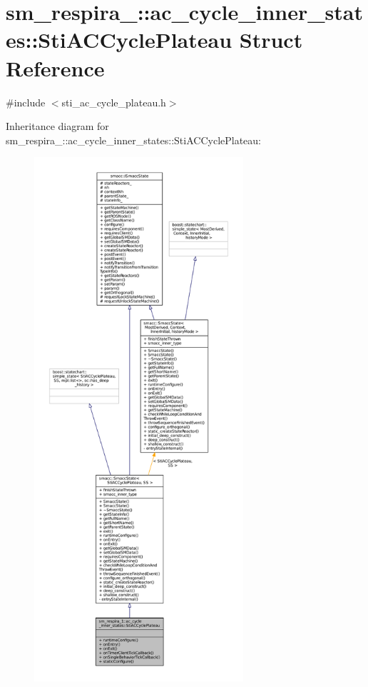 \hypertarget{structsm__respira__1_1_1ac__cycle__inner__states_1_1StiACCyclePlateau}{}\section{sm\+\_\+respira\+\_\+:\+:ac\+\_\+cycle\+\_\+inner\+\_\+states\+:\+:Sti\+A\+C\+Cycle\+Plateau Struct Reference}
\label{structsm__respira__1_1_1ac__cycle__inner__states_1_1StiACCyclePlateau}


{\ttfamily \#include $<$sti\+\_\+ac\+\_\+cycle\+\_\+plateau.\+h$>$}



Inheritance diagram for sm\+\_\+respira\+\_\+:\+:ac\+\_\+cycle\+\_\+inner\+\_\+states\+:\+:Sti\+A\+C\+Cycle\+Plateau\+:
\nopagebreak
\begin{figure}[H]
\begin{center}
\leavevmode
\includegraphics[height=550pt]{structsm__respira__1_1_1ac__cycle__inner__states_1_1StiACCyclePlateau__inherit__graph}
\end{center}
\end{figure}


